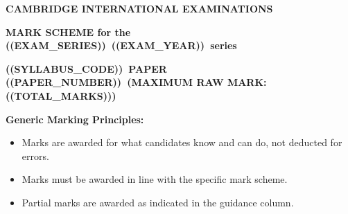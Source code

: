 \documentclass[11pt,a4paper]{article}
\newcommand{\ExamYear}{((EXAM_YEAR))}
\newcommand{\SyllabusCode}{((SYLLABUS_CODE))}
\newcommand{\PaperNumber}{((PAPER_NUMBER))}
\newcommand{\ExamSeries}{((EXAM_SERIES))}
\begin{document}
{\noindent\Large\textbf{CAMBRIDGE INTERNATIONAL EXAMINATIONS}}\par
{\noindent\large\textbf{MARK SCHEME for the \ExamSeries\ \ExamYear\ series}}\par
\vspace{0.4em}
{\noindent\textbf{\SyllabusCode\ PAPER \PaperNumber\ (MAXIMUM RAW MARK: ((TOTAL_MARKS)))}}\par
\vspace{0.8em}

\textbf{Generic Marking Principles:}
\begin{itemize}[leftmargin=0.6cm, itemsep=0.1em, topsep=0.2em]
  \item Marks are awarded for what candidates know and can do, not deducted for errors.
  \item Marks must be awarded in line with the specific mark scheme.
  \item Partial marks are awarded as indicated in the guidance column.
\end{itemize}

\vspace{0.8em}

\end{document}
